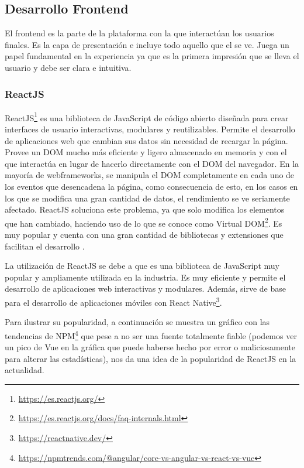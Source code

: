 \subsection{Desarrollo Frontend}

El frontend es la parte de la plataforma con la que interactúan los usuarios finales. Es la capa de presentación e incluye todo aquello que el se ve. Juega un papel fundamental en la experiencia ya que es la primera impresión que se lleva el usuario y debe ser clara e intuitiva.\newline

\subsubsection*{ReactJS}

ReactJS\footnote{\url{https://es.reactjs.org/}} es una biblioteca de JavaScript de código abierto diseñada para crear interfaces de usuario interactivas, modulares y reutilizables. Permite el desarrollo de aplicaciones web que cambian sus datos sin necesidad de recargar la página. Provee un DOM mucho más eficiente y ligero almacenado en memoria y con el que interactúa en lugar de hacerlo directamente con el DOM del navegador. En la mayoría de webframeworks, se manipula el DOM completamente en cada uno de los eventos que desencadena la página, como consecuencia de esto, en los casos en los que se modifica una gran cantidad de datos, el rendimiento se ve seriamente afectado. ReactJS soluciona este problema, ya que solo modifica los elementos que han cambiado, haciendo uso de lo que se conoce como Virtual DOM\footnote{\url{https://es.reactjs.org/docs/faq-internals.html}}. Es muy popular y cuenta con una gran cantidad de bibliotecas y extensiones que facilitan el desarrollo \cite{aggarwal2018modern}.\newline

La utilización de ReactJS se debe a que es una biblioteca de JavaScript muy popular y ampliamente utilizada en la industria. Es muy eficiente y permite el desarrollo de aplicaciones web interactivas y modulares. Además, sirve de base para el desarrollo de aplicaciones móviles con React Native\footnote{\url{https://reactnative.dev/}}.\newline

Para ilustrar su popularidad, a continuación se muestra un gráfico con las tendencias de NPM\footnote{\url{https://npmtrends.com/@angular/core-vs-angular-vs-react-vs-vue}} que pese a no ser una fuente totalmente fiable (podemos ver un pico de Vue en la gráfica que puede haberse hecho por error o maliciosamente para alterar las estadísticas), nos da una idea de la popularidad de ReactJS en la actualidad.


